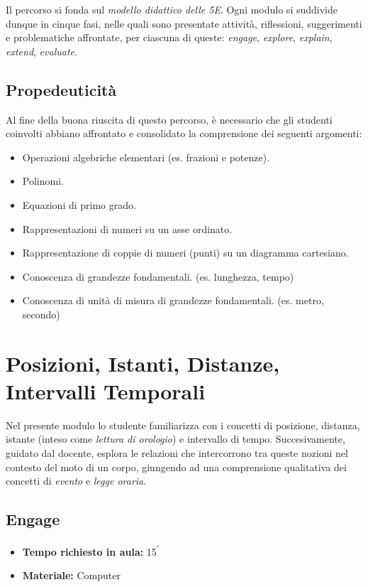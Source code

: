 \documentclass{report} \usepackage[T1]{fontenc} \usepackage[italian]{babel}
\begin{document}
Il percorso si fonda sul \emph{modello didattico delle 5E}\cite{bybee2006bscs}.
Ogni modulo si suddivide dunque in cinque fasi, nelle quali sono presentate
attività, riflessioni, suggerimenti e problematiche affrontate, per ciascuna
di queste: \emph{engage}, \emph{explore}, \emph{explain}, \emph{extend},
\emph{evaluate}.

\section{Propedeuticità}
Al fine della buona riuscita di questo percorso, è necessario che gli
studenti coinvolti abbiano affrontato e consolidato la comprensione
dei seguenti argomenti:
\begin{itemize}
\item Operazioni algebriche elementari (es. frazioni e potenze).
\item Polinomi.
\item Equazioni di primo grado.
\item Rappresentazioni di numeri su un asse ordinato.
\item Rappresentazione di coppie di numeri (punti) su un diagramma
      cartesiano.
\item Conoscenza di grandezze fondamentali.
      (es. lunghezza, tempo)
\item Conoscenza di unità di misura di grandezze fondamentali.
      (es. metro, secondo)
\end{itemize}

\chapter{Posizioni, Istanti, Distanze, Intervalli Temporali} \label{posizioni_istanti}
Nel presente modulo lo studente familiarizza con i concetti
di posizione, distanza, istante (inteso come
\emph{lettura di orologio}) e intervallo di tempo.
Succesivamente, guidato dal docente, esplora le relazioni
che intercorrono tra queste nozioni nel contesto del moto di
un corpo, giungendo ad una comprensione qualitativa dei
concetti di \emph{evento} e \emph{legge oraria}.

\section{Engage}
\begin{itemize}
\item \textbf{Tempo richiesto in aula:} 15\textsuperscript{$\prime$}
\item \textbf{Materiale:} Computer
\end{itemize}
\end{document}
